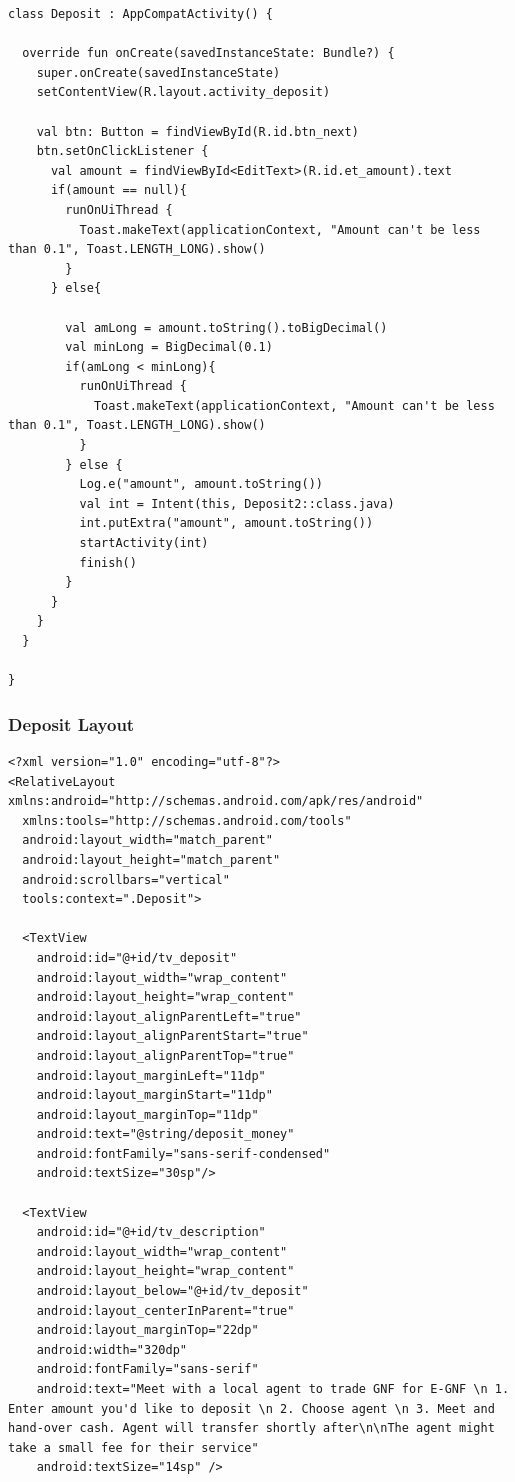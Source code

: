 \documentclass[11pt, a4paper]{article}
\begin{document}
\begin{appendices}
\begin{lstlisting}
class Deposit : AppCompatActivity() {

  override fun onCreate(savedInstanceState: Bundle?) {
    super.onCreate(savedInstanceState)
    setContentView(R.layout.activity_deposit)

    val btn: Button = findViewById(R.id.btn_next)
    btn.setOnClickListener {
      val amount = findViewById<EditText>(R.id.et_amount).text
      if(amount == null){
        runOnUiThread {
          Toast.makeText(applicationContext, "Amount can't be less than 0.1", Toast.LENGTH_LONG).show()
        }
      } else{

        val amLong = amount.toString().toBigDecimal()
        val minLong = BigDecimal(0.1)
        if(amLong < minLong){
          runOnUiThread {
            Toast.makeText(applicationContext, "Amount can't be less than 0.1", Toast.LENGTH_LONG).show()
          }
        } else {
          Log.e("amount", amount.toString())
          val int = Intent(this, Deposit2::class.java)
          int.putExtra("amount", amount.toString())
          startActivity(int)
          finish()
        }
      }
    }
  }

}
\end{lstlisting}
\subsubsection{Deposit Layout}
\begin{lstlisting}
<?xml version="1.0" encoding="utf-8"?>
<RelativeLayout xmlns:android="http://schemas.android.com/apk/res/android"
  xmlns:tools="http://schemas.android.com/tools"
  android:layout_width="match_parent"
  android:layout_height="match_parent"
  android:scrollbars="vertical"
  tools:context=".Deposit">

  <TextView
    android:id="@+id/tv_deposit"
    android:layout_width="wrap_content"
    android:layout_height="wrap_content"
    android:layout_alignParentLeft="true"
    android:layout_alignParentStart="true"
    android:layout_alignParentTop="true"
    android:layout_marginLeft="11dp"
    android:layout_marginStart="11dp"
    android:layout_marginTop="11dp"
    android:text="@string/deposit_money"
    android:fontFamily="sans-serif-condensed"
    android:textSize="30sp"/>

  <TextView
    android:id="@+id/tv_description"
    android:layout_width="wrap_content"
    android:layout_height="wrap_content"
    android:layout_below="@+id/tv_deposit"
    android:layout_centerInParent="true"
    android:layout_marginTop="22dp"
    android:width="320dp"
    android:fontFamily="sans-serif"
    android:text="Meet with a local agent to trade GNF for E-GNF \n 1. Enter amount you'd like to deposit \n 2. Choose agent \n 3. Meet and hand-over cash. Agent will transfer shortly after\n\nThe agent might take a small fee for their service"
    android:textSize="14sp" />


\end{lstlisting}
\end{appendices}
\end{document}
